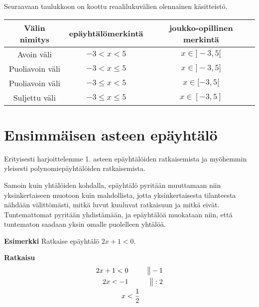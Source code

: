 Seuraavaan taulukkoon on koottu reaalilukuvälien olennainen käsitteistö.

\begin{tabular}{|c|c|c|}
\hline
Välin nimitys & epäyhtälömerkintä & joukko-opillinen merkintä \\
\hline
Avoin väli & $-3<x<5$ & $x \in ]-3,5[$ \\
\hline
Puoliavoin väli & $-3<x \leq 5$ & $x \in ]-3,5]$ \\
\hline
Puoliavoin väli & $-3\leq x < 5$ & $x \in [-3,5[$ \\
\hline
Suljettu väli & $-3\leq x \leq 5$ & $x \in [-3,5]$ \\
\hline
\end{tabular}


\section{Ensimmäisen asteen epäyhtälö}

Erityisesti harjoittelemme 1. asteen epäyhtälöiden ratkaisemista ja myöhemmin yleisesti polynomiepäyhtälöiden ratkaisemista.

Samoin kuin yhtälöiden kohdalla, epäyhtälö pyritään muuttamaan niin yksinkertaiseen muotoon kuin mahdollista, jotta yksinkertaisesta tilanteesta nähdään välittömästi, mitkä luvut kuuluvat ratkaisuun ja mitkä eivät. Tuntemattomat pyritään yhdistämään, ja epäyhtälöä muokataan niin, että tuntematon saadaan yksin omalle puolelleen yhtälöä.


\textbf{Esimerkki}
Ratkaise epäyhtälö $2x+1<0$.

\textbf{Ratkaisu}
\begin{align*}
2x+1<0 \ \ \ \ \ &&\big\| -1 \\
2x<-1 \ \ \ \ \ &&\big\| :2 \\
x<\-\frac{1}{2}
\end{align*}

